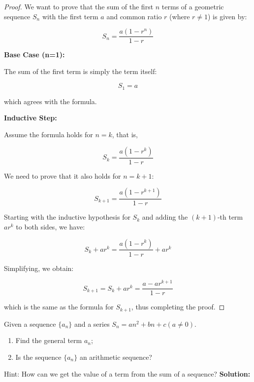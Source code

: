 \documentclass[
	12pt, %
	fleqn, %
	a4paper, %
]{LegrandOrangeBook}
\begin{document}
\begin{proof}
    We want to prove that the sum of the first \( n \) terms of a geometric sequence \( S_n \) with the first term \( a \) and common ratio \( r \) (where \( r \neq 1 \)) is given by:

\[ S_n = \frac{a(1 - r^n)}{1 - r} \]

\textbf{Base Case (n=1):}

The sum of the first term is simply the term itself:

\[ S_1 = a \]

which agrees with the formula.

\textbf{Inductive Step:}

Assume the formula holds for \( n = k \), that is,

\[ S_k = \frac{a(1 - r^k)}{1 - r} \]

We need to prove that it also holds for \( n = k+1 \):

\[ S_{k+1} = \frac{a(1 - r^{k+1})}{1 - r} \]

Starting with the inductive hypothesis for \( S_k \) and adding the \( (k+1) \)-th term \( ar^k \) to both sides, we have:

\[ S_k + ar^k = \frac{a(1 - r^k)}{1 - r} + ar^k \]

Simplifying, we obtain:

\[ S_{k+1} = S_k + ar^k = \frac{a - ar^{k+1}}{1 - r} \]

which is the same as the formula for \( S_{k+1} \), thus completing the proof.
\end{proof}
\begin{exercise}
    Given a sequence \( \{a_n\} \) and a series \( S_n = an^2 + bn + c (a \neq 0) \).

\begin{enumerate}
    \item Find the general term \( a_n \);
    \item Is the sequence \( \{a_n\} \) an arithmetic sequence?
\end{enumerate}
\end{exercise}
Hint: How can we get the value of a term from the sum of a sequence?
\textbf{Solution:}
\end{document}
